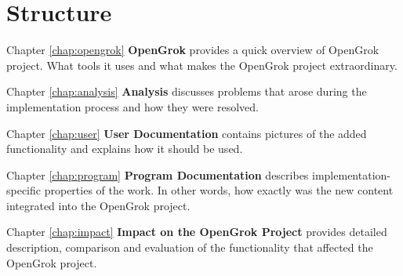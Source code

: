\section{Structure}

Chapter \ref{chap:opengrok} \textbf{OpenGrok} provides a quick overview of OpenGrok project. What tools it uses and what
makes the OpenGrok project extraordinary.

Chapter \ref{chap:analysis} \textbf{Analysis} discusses problems that arose during the implementation process and how
they were resolved.

Chapter \ref{chap:user} \textbf{User Documentation} contains pictures of the added functionality and explains how it
should be used.

Chapter \ref{chap:program} \textbf{Program Documentation} describes implementation-specific properties of the work.
In other words, how exactly was the new content integrated into the OpenGrok project.

Chapter \ref{chap:impact} \textbf{Impact on the OpenGrok Project} provides detailed description, comparison and
evaluation of the functionality that affected the OpenGrok project.
